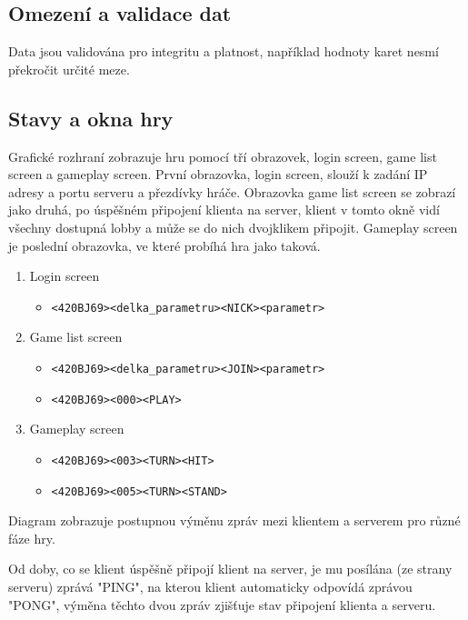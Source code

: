 \documentclass{article}
\begin{document}
\subsection{Omezení a validace dat}
Data jsou validována pro integritu a platnost, například hodnoty karet nesmí překročit určité meze.

\subsection{Stavy a okna hry}

Grafické rozhraní zobrazuje hru pomocí tří obrazovek, login screen, game list screen a gameplay screen. První obrazovka, login screen, slouží k zadání IP adresy a portu serveru a přezdívky hráče. Obrazovka game list screen se zobrazí jako druhá, po úspěšném připojení klienta na server, klient v tomto okně vidí všechny dostupná lobby a může se do nich dvojklikem připojit. Gameplay screen je poslední obrazovka, ve které probíhá hra jako taková.

\begin{enumerate}
    \item Login screen
	\begin{itemize}
	    \item \texttt{<420BJ69><delka\_parametru><NICK><parametr>}
    	\end{itemize}
    \item Game list screen
	\begin{itemize}
	    \item \texttt{<420BJ69><delka\_parametru><JOIN><parametr>}
	    \item \texttt{<420BJ69><000><PLAY>}
	\end{itemize}
    \item Gameplay screen
	\begin{itemize}
	    \item \texttt{<420BJ69><003><TURN><HIT>}
	    \item \texttt{<420BJ69><005><TURN><STAND>}
	\end{itemize}
\end{enumerate}

Diagram zobrazuje postupnou výměnu zpráv mezi klientem a serverem pro různé fáze hry.

Od doby, co se klient úspěšně připojí klient na server, je mu posílána (ze strany serveru) zprává "PING", na kterou klient automaticky odpovídá zprávou "PONG", výměna těchto dvou zpráv zjišťuje stav připojení klienta a serveru.
\end{document}
